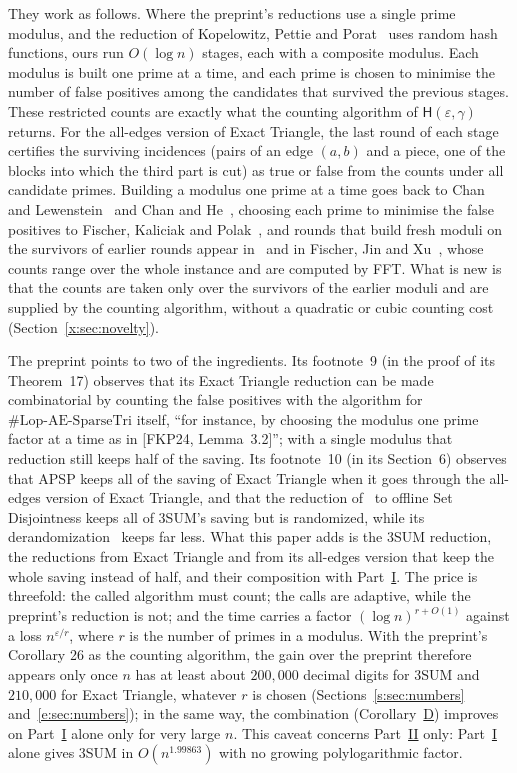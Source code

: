\documentclass[11pt]{article}
\theoremstyle{definition}
\theoremstyle{remark}
\newcommand{\Lop}{\mathrm{Lop}\text{-}\allowbreak\mathrm{AE}\text{-}\allowbreak\mathrm{SparseTri}}
\newcommand{\Hyp}{\mathsf{H}}
\begin{document}
They work as follows. Where the preprint's reductions use a single prime modulus, and the reduction of Kopelowitz, Pettie and Porat~\cite{KPP16} uses random hash functions, ours run $O(\log n)$ stages, each with a composite modulus. Each modulus is built one prime at a time, and each prime is chosen to minimise the number of false positives among the candidates that survived the previous stages. These restricted counts are exactly what the counting algorithm of $\Hyp(\varepsilon,\gamma)$ returns. For the all-edges version of Exact Triangle, the last round of each stage certifies the surviving incidences (pairs of an edge $(a,b)$ and a piece, one of the blocks into which the third part is cut) as true or false from the counts under all candidate primes. Building a modulus one prime at a time goes back to Chan and Lewenstein~\cite{CL15} and Chan and He~\cite{CH20}, choosing each prime to minimise the false positives to Fischer, Kaliciak and Polak~\cite{FKP24}, and rounds that build fresh moduli on the survivors of earlier rounds appear in~\cite{CL15} and in Fischer, Jin and Xu~\cite{FJX25}, whose counts range over the whole instance and are computed by FFT. What is new is that the counts are taken only over the survivors of the earlier moduli and are supplied by the counting algorithm, without a quadratic or cubic counting cost (Section~\ref{x:sec:novelty}).

The preprint points to two of the ingredients. Its footnote~9 (in the proof of its Theorem~17) observes that its Exact Triangle reduction can be made combinatorial by counting the false positives with the algorithm for $\#\Lop$ itself, ``for instance, by choosing the modulus one prime factor at a time as in [FKP24, Lemma~3.2]''; with a single modulus that reduction still keeps half of the saving. Its footnote~10 (in its Section~6) observes that APSP keeps all of the saving of Exact Triangle when it goes through the all-edges version of Exact Triangle, and that the reduction of~\cite{KPP16} to offline Set Disjointness keeps all of 3SUM's saving but is randomized, while its derandomization~\cite{FKP24} keeps far less. What this paper adds is the 3SUM reduction, the reductions from Exact Triangle and from its all-edges version that keep the whole saving instead of half, and their composition with Part~\hyperref[m:partI]{I}. The price is threefold: the called algorithm must count; the calls are adaptive, while the preprint's reduction is not; and the time carries a factor $(\log n)^{r+O(1)}$ against a loss $n^{\varepsilon/r}$, where $r$ is the number of primes in a modulus. With the preprint's Corollary 26 as the counting algorithm, the gain over the preprint therefore appears only once $n$ has at least about $200{,}000$ decimal digits for 3SUM and $210{,}000$ for Exact Triangle, whatever $r$ is chosen (Sections~\ref{s:sec:numbers} and~\ref{e:sec:numbers}); in the same way, the combination (Corollary~\hyperref[m:introD]{D}) improves on Part~\hyperref[m:partI]{I} alone only for very large $n$. This caveat concerns Part~\hyperref[m:partII]{II} only: Part~\hyperref[m:partI]{I} alone gives 3SUM in $O(n^{1.99863})$ with no growing polylogarithmic factor.
\end{document}
